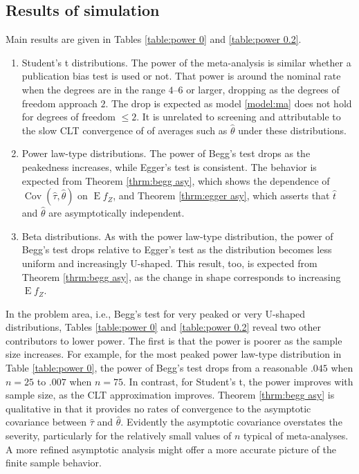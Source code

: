 \documentclass[12pt]{article}
\newcommand{\z}{Z}
\renewcommand{\t}{t}
\DeclareMathOperator{\E}{E}
\DeclareMathOperator{\cov}{Cov}
\begin{document}
\subsection{Results of simulation}
Main results are given in Tables \ref{table:power 0} and \ref{table:power 0.2}.
\begin{enumerate}
\item Student's t distributions. The power of the meta-analysis is
  similar whether a publication bias test is used or not.  That power
  is around the nominal rate when the degrees are in the range
  $4\text{--}6$ or larger, dropping as the degrees of freedom approach $2$. The
  drop is expected as model \eqref{model:ma} does not hold for degrees
  of freedom $\le 2$. It is unrelated to screening and attributable to
  the slow CLT convergence of of averages such as 
  $\hat\theta$ under these distributions.

\item Power law-type distributions. The power of Begg's test drops as
  the peakedness increases, while Egger's test is consistent. %
  The behavior is
  expected from Theorem \ref{thrm:begg asy}, which shows the
  dependence of $\cov(\hat\tau,\hat\theta)$ on $\E f_\z$, and Theorem
  \ref{thrm:egger asy}, which asserts that $\hat\t$ and $\hat\theta$
  are asymptotically independent.

\item Beta distributions. As with the power law-type distribution, the
  power of Begg's test drops relative to Egger's test as the
  distribution becomes less uniform and increasingly U-shaped. This
  result, too, is expected from Theorem \ref{thrm:begg asy}, as the
  change in shape corresponds to increasing $\E f_\z$.  
\end{enumerate}

In the problem area, i.e., Begg's test for very peaked or very
U-shaped distributions, Tables \ref{table:power 0} and
\ref{table:power 0.2} reveal two other contributors to lower
power. The first is that the power is poorer as the sample size
increases. For example, for the most peaked power law-type
distribution in Table \ref{table:power 0}, the power of Begg's test
drops from a reasonable $.045$ when $n=25$ to $.007$ when $n=75$. In
contrast, for Student's t, the power improves with sample size, as the
CLT approximation improves. Theorem \ref{thrm:begg asy} is qualitative
in that it provides no rates of convergence to the asymptotic
covariance between $\hat\tau$ and $\hat\theta$. Evidently the
asymptotic covariance overstates the severity, particularly for the
relatively small values of $n$ typical of meta-analyses. A more
refined asymptotic analysis might offer a more accurate picture of the
finite sample behavior.
\end{document}
